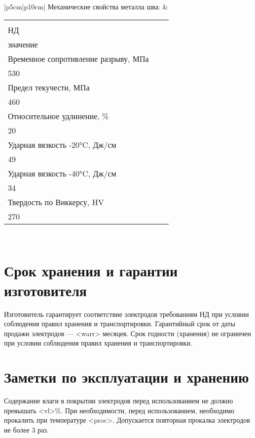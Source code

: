 \documentclass[russian,utf8,pointsection,nocolumnxxxi,nocolumnxxxii,12pt]{eskdtext}
\renewcommand{\textsuperscript}[1]{\raisebox{0.8ex}{\scalebox{0.66}{#1}}}
\renewcommand{\textsubscript}[1]{\raisebox{-0.4ex}{\scalebox{0.66}{#1}}}
\begin{document}
\begin{longtable}{|p{5cm}|p{10cm}|}
Механические свойства металла шва: &  
\vspace{-2.5mm} 
\begin{tabular}{|p{5cm}|p{1.8cm}|p{2cm}|}
\hline 
\makecell[c]{Параметр} & \makecell[c]{Требование \\НД} & \makecell[c]{Фактическое \\значение} \\
\hline 
Временное сопротивление разрыву, МПа & \makecell[c]{не менее\\ 530} & \makecell[c]{606,00} \\
\hline 
Предел текучести, МПа & \makecell[c]{не менее\\ 460} & \makecell[c]{522,00} \\
\hline 
Относительное удлинение, \% & \makecell[c]{не менее\\ 20} & \makecell[c]{28,80} \\
\hline 
Ударная вязкость -20°C, Дж/см\textsuperscript{2} & \makecell[c]{не менее \\49} & \makecell[c]{162,00} \\
\hline 
Ударная вязкость -40°C, Дж/см\textsuperscript{2}  & \makecell[c]{не менее\\ 34} & \makecell[c]{104,00} \\
\hline
Твердость по Виккерсу, HV\textsubscript{10} & \makecell[c]{не более\\ 270} & \makecell[c]{202,00} \\
\hline 
\end{tabular}
\vspace{2.5mm}  
\\
\hline 

\end{longtable}

\section{Срок хранения и гарантии изготовителя}
Изготовитель гарантирует соответствие электродов требованиям НД при условии соблюдения правил хранения и транспортировки. Гарантийный срок от даты продажи электродов — <warr> месяцев. 
Срок годности (хранения) не ограничен при условии соблюдения правил хранения и транспортировки.

\section{Заметки по эксплуатации и хранению}
Содержание влаги в покрытии электродов перед использованием не должно превышать <vl>\%.
При необходимости, перед использованием, необходимо прокалить при температуре <proc>. Допускается повторная прокалка электродов не более 3 раз.
\end{document}
